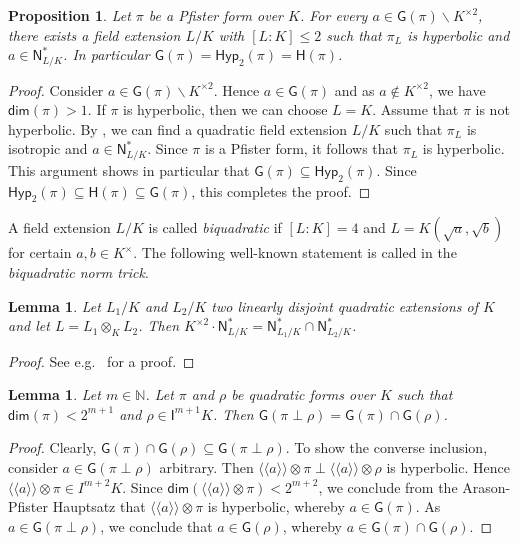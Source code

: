 \documentclass[twoside,11pt]{amsart}
\numberwithin{equation}{section}
\newtheorem{prop}[equation]{Proposition}
\newtheorem{lem}[equation]{Lemma}
\theoremstyle{definition}
\renewcommand{\dim}{\operatorname{\mathsf{dim}}}
\newcommand\N{\operatorname{N}}
\newcommand{\mg}[1]{{#1}^{\times}}
\newcommand{\sq}[1]{{#1}^{\times 2}}
\newcommand{\nat}{\mathbb{N}}
\newcommand{\la}{\langle}
\newcommand{\ra}{\rangle}
\newcommand{\lla}{\la\!\la}
\newcommand{\rra}{\ra\!\ra}
\renewcommand{\leq}{\leqslant}
\newcommand{\I}{\mathsf{I}}
\renewcommand{\N}{\mathsf{N}}
\newcommand{\G}{\mathsf{G}}
\renewcommand{\H}{\mathsf{H}}
\newcommand{\Hyp}{\mathsf{Hyp}}
\renewcommand{\setminus}{\smallsetminus}
\renewcommand{\dim}{\mathsf{dim}}
\renewcommand{\leq}{\leqslant}
\renewcommand{\setminus}{\smallsetminus}
\begin{document}
\begin{prop}\label{P:pfiratcon}
Let $\pi$ be a Pfister form over $K$.
For every $a\in\G(\pi)\setminus\sq{K}$, there exists a field extension $L/K$ with $[L:K]\leq 2$ such that $\pi_L$ is hyperbolic and $a\in\N^\ast_{L/K}$. In particular $\G(\pi)=\Hyp_2(\pi)=\H(\pi)$.
\end{prop}
\begin{proof}
Consider $a\in\G(\pi)\setminus\sq{K}$.
Hence $a\in\G(\pi)$ and as $a\notin\sq{K}$, we have $\dim(\pi)>1$.
If $\pi$ is hyperbolic, then we can choose $L=K$.
Assume that $\pi$ is not hyperbolic.
By , we can find a quadratic field extension $L/K$ such that $\pi_L$ is isotropic and $a\in\N_{L/K}^\ast$.
Since $\pi$ is a Pfister form, it follows that $\pi_L$ is hyperbolic. 
This argument shows in particular that $\G(\pi)\subseteq\Hyp_2(\pi)$.
Since $\Hyp_2(\pi)\subseteq\H(\pi)\subseteq\G(\pi)$, this completes the proof.
\end{proof}


A field extension $L/K$ is called \emph{biquadratic} if $[L:K]=4$ and $L=K(\sqrt{a},\sqrt{b})$ for certain $a,b\in\mg{K}$.
The following well-known statement is called in \cite{Bha14} the \emph{biquadratic norm trick}.

\begin{lem}\label{biquatrick}
    Let $L_1/K$ and $L_2/K$ two linearly disjoint quadratic extensions of $K$ and let $L=L_1\otimes_KL_2$.
    Then $\sq{K}\cdot\N_{L/K}^\ast= \N_{L_1/K}^\ast\cap\N_{L_2/K}^\ast$.
\end{lem}
\begin{proof}
See e.g.~\cite[Lemma 2.1]{PTW12} for a proof.
\end{proof}

\begin{lem}\label{L:AP-trick}
Let $m\in\nat$. Let $\pi$ and $\rho$ be quadratic forms over $K$ such that 
$\dim(\pi)<2^{m+1}$ and $\rho\in \I^{m+1}K$.
Then $\G(\pi\perp\rho)=\G(\pi)\cap\G(\rho)$.
\end{lem}
\begin{proof}
Clearly, $\G(\pi)\cap\G(\rho)\subseteq \G(\pi\perp\rho)$.
To show the converse inclusion, consider $a\in\G(\pi\perp\rho)$ arbitrary.
Then $\lla a\rra\otimes \pi \perp\lla a\rra\otimes \rho$ is hyperbolic.
Hence $\lla a\rra\otimes\pi\in I^{m+2}K$.
Since $\dim(\lla a\rra\otimes\pi)<2^{m+2}$, we conclude from the Arason-Pfister Hauptsatz \cite[Theorem 23.7]{EKM08} that $\lla a\rra\otimes\pi$ is hyperbolic, whereby $a\in\G(\pi)$. As $a\in\G(\pi\perp\rho)$, we conclude that $a\in\G(\rho)$, whereby $a\in\G(\pi)\cap\G(\rho)$.
\end{proof}
 
\end{document}
